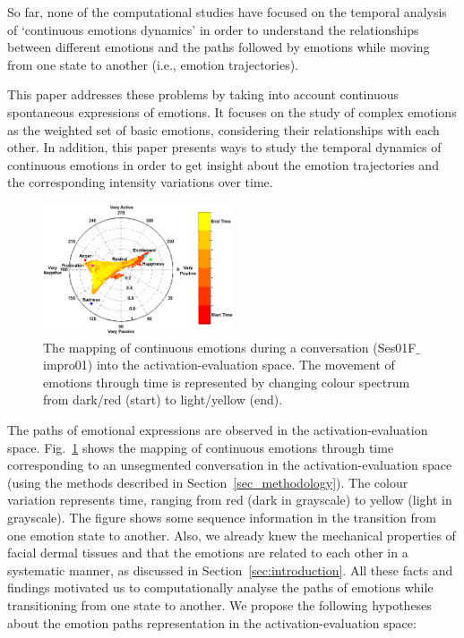 \documentclass[10pt,journal,cspaper,compsoc]{IEEEtran}
\begin{document}
So far, none of the computational studies have focused on the temporal analysis of `continuous emotions dynamics' in order to understand the relationships between different emotions and the paths followed by emotions while moving from one state to another (i.e., emotion trajectories).

This paper addresses these problems by taking into account continuous spontaneous expressions of emotions. It focuses on the study of complex emotions as the weighted set of basic emotions, considering their relationships with each other. In addition, this paper presents ways to study the temporal dynamics of continuous emotions in order to get insight about the emotion trajectories and the corresponding intensity variations over time.

\begin{figure}[!t]
\centering
\includegraphics[width=0.5\textwidth]{figures/Ch7/con_emo_traj_color_up.png}
\caption{The mapping of continuous emotions during a conversation (Ses01F$\_$impro01) into the activation-evaluation space. The movement of emotions through time is represented by changing colour spectrum from dark/red (start) to light/yellow (end).}
\label{fig_con_emo_traj_color_up}
\end{figure}



The paths of emotional expressions are observed in the activation-evaluation space. Fig.~\ref{fig_con_emo_traj_color_up} shows the mapping of continuous emotions through time corresponding to an unsegmented conversation in the activation-evaluation space (using the methods described in Section~\ref{sec_methodology}). The colour variation represents time, ranging from red (dark in grayscale) to yellow (light in grayscale). The figure shows some sequence information in the transition from one emotion state to another. Also, we already knew the mechanical properties of facial dermal tissues and that the emotions are related to each other in a systematic manner, as discussed in Section~\ref{sec:introduction}. All these facts and findings motivated us to computationally analyse the paths of emotions while transitioning from one state to another. We propose the following hypotheses about the emotion paths representation in the activation-evaluation space:
\end{document}
